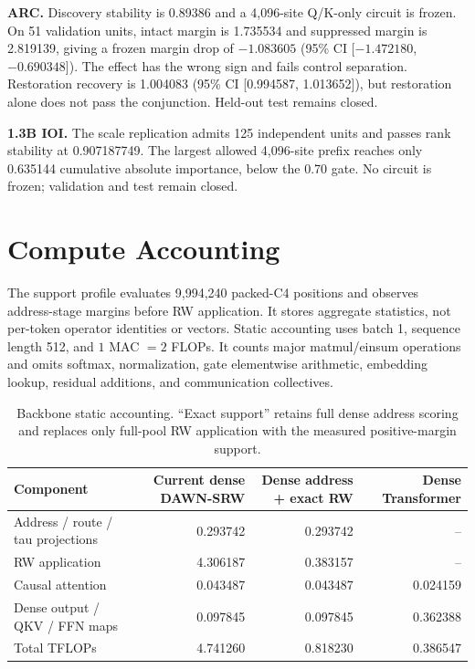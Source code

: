 \documentclass{article}
\newcommand{\DAWN}{DAWN-SRW}
\newcommand{\smallhead}[1]{\vspace{0.25em}\noindent\textbf{#1}}
\begin{document}
\smallhead{ARC.}
Discovery stability is 0.89386 and a 4,096-site Q/K-only circuit is frozen.
On 51 validation units, intact margin is 1.735534 and suppressed margin is
2.819139, giving a frozen margin drop of \(-1.083605\) (95\% CI
[\(-1.472180\), \(-0.690348\)]). The effect has the wrong sign and fails
control separation. Restoration recovery is 1.004083 (95\% CI
[0.994587, 1.013652]), but restoration alone does not pass the conjunction.
Held-out test remains closed.

\smallhead{1.3B IOI.}
The scale replication admits 125 independent units and passes rank stability
at 0.907187749. The largest allowed 4,096-site prefix reaches only 0.635144
cumulative absolute importance, below the 0.70 gate. No circuit is frozen;
validation and test remain closed.

\section{Compute Accounting}
\label{app:compute}

The support profile evaluates 9,994,240 packed-C4 positions and observes
address-stage margins before RW application. It stores aggregate statistics,
not per-token operator identities or vectors. Static accounting uses batch 1,
sequence length 512, and \(1\) MAC \(=2\) FLOPs. It counts major
matmul/einsum operations and omits softmax, normalization, gate elementwise
arithmetic, embedding lookup, residual additions, and communication
collectives.

\begin{table}[h]
\centering
\caption{Backbone static accounting. ``Exact support'' retains full dense
address scoring and replaces only full-pool RW application with the measured
positive-margin support.}
\small
\begin{tabular}{lrrr}
\toprule
Component & Current dense \DAWN{} & Dense address + exact RW & Dense Transformer\\
\midrule
Address / route / tau projections & 0.293742 & 0.293742 & --\\
RW application & 4.306187 & 0.383157 & --\\
Causal attention & 0.043487 & 0.043487 & 0.024159\\
Dense output / QKV / FFN maps & 0.097845 & 0.097845 & 0.362388\\
\midrule
Total TFLOPs & 4.741260 & 0.818230 & 0.386547\\
\bottomrule
\end{tabular}
\end{table}
\end{document}
